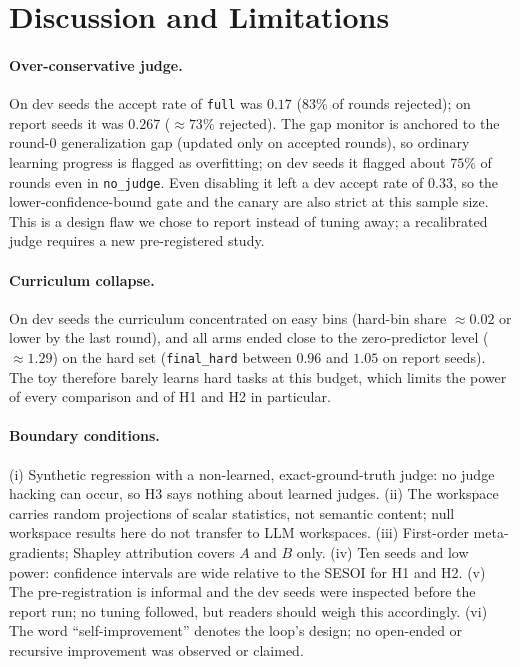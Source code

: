 \documentclass[11pt]{article}
\newcommand{\fh}{\texttt{final\_hard}}
\begin{document}
\section{Discussion and Limitations}

\paragraph{Over-conservative judge.} On dev seeds the accept rate of \texttt{full} was $0.17$ ($83\%$ of rounds rejected); on report seeds it was $0.267$ ($\approx73\%$ rejected).
The gap monitor is anchored to the round-0 generalization gap (updated only on accepted rounds), so ordinary learning progress is flagged as overfitting; on dev seeds it flagged about $75\%$ of rounds even in \texttt{no\_judge}.
Even disabling it left a dev accept rate of $0.33$, so the lower-confidence-bound gate and the canary are also strict at this sample size. This is a design flaw we chose to report instead of tuning away; a recalibrated judge requires a new pre-registered study.

\paragraph{Curriculum collapse.} On dev seeds the curriculum concentrated on easy bins (hard-bin share $\approx0.02$ or lower by the last round), and all arms ended close to the zero-predictor level ($\approx1.29$) on the hard set (\fh{} between $0.96$ and $1.05$ on report seeds).
The toy therefore barely learns hard tasks at this budget, which limits the power of every comparison and of H1 and H2 in particular.

\paragraph{Boundary conditions.} (i) Synthetic regression with a non-learned, exact-ground-truth judge: no judge hacking can occur, so H3 says nothing about learned judges.
(ii) The workspace carries random projections of scalar statistics, not semantic content; null workspace results here do not transfer to LLM workspaces.
(iii) First-order meta-gradients; Shapley attribution covers $A$ and $B$ only.
(iv) Ten seeds and low power: confidence intervals are wide relative to the SESOI for H1 and H2.
(v) The pre-registration is informal and the dev seeds were inspected before the report run; no tuning followed, but readers should weigh this accordingly.
(vi) The word ``self-improvement'' denotes the loop's design; no open-ended or recursive improvement was observed or claimed.
\end{document}
